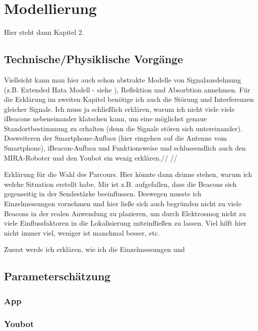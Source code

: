 \chapter{Modellierung}
Hier steht dann Kapitel 2.

\section{Technische/Physiklische Vorgänge}
Vielleicht kann man hier auch schon abstrakte Modelle von Signalausdehnung (z.B. Extended Hata Modell - siehe ), Reflektion und Absorbtion annehmen. Für die Erklärung im zweiten Kapitel benötige ich auch die Störung und Interferenzen gleicher Signale. Ich muss ja schließlich erklären, warum ich nicht viele viele iBeacons nebeneinander klatschen kann, um eine möglichst genaue Standortbestimmung zu erhalten (denn die Signale stören sich untereinander).  Desweiteren der Smartphone-Aufbau (hier eingehen auf die Antenne vom Smartphone), iBeacon-Aufbau und Funktionsweise und schlussendlich auch den MIRA-Roboter und den Youbot ein wenig erklären.// //

Erklärung für die Wahl des Parcours. Hier könnte dann drinne stehen, warum ich welche Situation erstellt habe. Mir ist z.B. aufgefallen, dass die Beacons sich gegenseitig in der Sendestärke beeinflussen. Deswegen musste ich Einzelmessungen vornehmen und hier ließe sich auch begründen nicht zu viele Beacons in der realen Anwendung zu plazieren, um durch Elektrosmog nicht zu viele Einflussfaktoren in die Lokalisierung miteinfließen zu lassen. Viel hilft hier nicht immer viel, weniger ist manchmal besser, etc.

Zuerst werde ich erklären, wie ich die Einzelmessungen und 

\section{Parameterschätzung}
\subsection{App}
\subsection{Youbot}